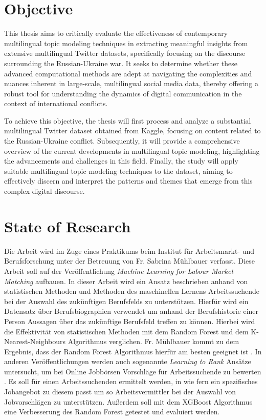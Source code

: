 \documentclass[
    11pt,
    a4paper,
    egregdoesnotlikesansseriftitles,
    toc=chapterentrywithdots,
    oneside,openright,
    titlepage,
    parskip=half,
    headings=normal,  %
    listof=totoc,
    bibliography=totoc,
    index=totoc,
    captions=tableheading,  %
    chapterprefix,
    listof=flat,
    final
]{scrbook}
\begin{document}
{\let\clearpage\relax \chapter{Objective}}
This thesis aims to critically evaluate the effectiveness of contemporary multilingual topic modeling techniques in extracting meaningful insights from extensive multilingual Twitter datasets, specifically focusing on the discourse surrounding the Russian-Ukraine war. It seeks to determine whether these advanced computational methods are adept at navigating the complexities and nuances inherent in large-scale, multilingual social media data, thereby offering a robust tool for understanding the dynamics of digital communication in the context of international conflicts.

To achieve this objective, the thesis will first process and analyze a substantial multilingual Twitter dataset obtained from Kaggle, focusing on content related to the Russian-Ukraine conflict. Subsequently, it will provide a comprehensive overview of the current developments in multilingual topic modeling, highlighting the advancements and challenges in this field. Finally, the study will apply suitable multilingual topic modeling techniques to the dataset, aiming to effectively discern and interpret the patterns and themes that emerge from this complex digital discourse.

{\let\clearpage\relax \chapter{State of Research}}
Die Arbeit wird im Zuge eines Praktikums beim Institut für Arbeitsmarkt- und Berufsforschung unter der Betreuung von Fr. Sabrina Mühlbauer verfasst. Diese Arbeit soll auf der Veröffentlichung \textit{Machine Learning for Labour Market Matching} aufbauen\cite{mül}. In dieser Arbeit wird ein Ansatz beschrieben anhand von statistischen Methoden und Methoden des maschinellen Lernens Arbeitssuchende bei der Auswahl des zukünftigen Berufsfelds zu unterstützen. Hierfür wird ein Datensatz über Berufsbiographien verwendet um anhand der Berufshistorie einer Person Aussagen über das zukünftige Berufsfeld treffen zu können. Hierbei wird die Effektivität von statistischen Methoden mit dem Random Forest und dem K-Nearest-Neighbours Algorithmus verglichen. Fr. Mühlbauer kommt zu dem Ergebnis, dass der Random Forest Algorithmus hierfür am besten geeignet ist \cite{mül}. In anderen Veröffentlichungen werden auch sogenannte \textit{Learning to Rank} Ansätze untersucht, um bei Online Jobbörsen Vorschläge für Arbeitssuchende zu bewerten \cite{hiri}.
Es soll für einen Arbeitssuchenden ermittelt werden, in wie fern ein spezifisches Jobangebot zu diesem passt um so Arbeitsvermittler bei der Auswahl von Jobvorschlägen zu unterstützen. Außerdem soll mit dem XGBoost Algorithmus eine Verbesserung des Random Forest getestet und evaluiert werden.
\newline
\end{document}
